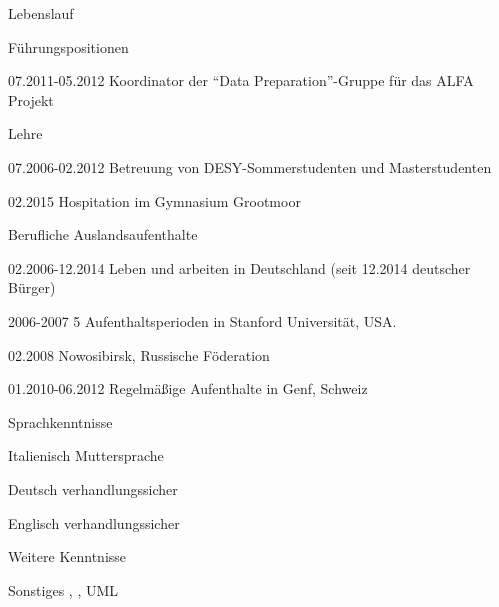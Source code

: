 \documentclass[11pt,a4paper]{scrartcl}
\newcommand{\versal}[1]{\textsf{\textsmaller{\MakeUppercase{\caps{#1}}}}\xspace}
\newcommand*{\ac}[1]{\versal{#1}}
\begin{document}
\begin{cv}{Lebenslauf}
\begin{cvlist}{F\"uhrungspositionen}
\item [07.2011-05.2012] Koordinator der "`Data Preparation"'-Gruppe
f\"ur das ALFA Projekt
\end{cvlist}

\begin{cvlist}{Lehre}
\item [07.2006-02.2012] Betreuung von DESY-Sommerstudenten und
Masterstudenten
\item [02.2015] Hospitation im Gymnasium Grootmoor
\end{cvlist}

\begin{cvlist}{Berufliche Auslandsaufenthalte}
\item [02.2006-12.2014] Leben und arbeiten in Deutschland (seit 12.2014
deutscher B{\"u}rger)
\item [2006-2007] 5 Aufenthaltsperioden in Stanford Universit\"at, USA.
\item [02.2008] Nowosibirsk, Russische F\"oderation
\item [01.2010-06.2012] Regelm\"a{\ss}ige Aufenthalte in Genf, Schweiz
\end{cvlist}

\begin{cvlist}{Sprachkenntnisse}
\item [Italienisch] Muttersprache
\item [Deutsch] verhandlungssicher
\item [Englisch] verhandlungssicher
\end{cvlist}

\begin{cvlist}{Weitere \ac{EDV} Kenntnisse}
\item[Sonstiges] \ac{MS OFFICE}, \ac{\LaTeX}, UML
\end{cvlist}



\end{cv}
\end{document}
